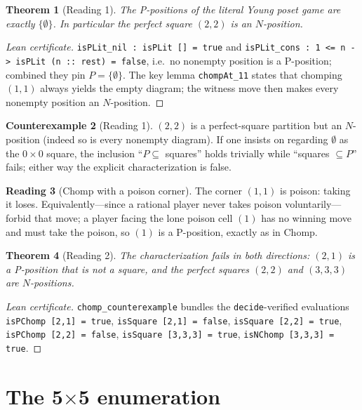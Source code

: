\documentclass[11pt]{article}
\newtheorem{theorem}{Theorem}
\theoremstyle{definition}
\newtheorem{reading}[theorem]{Reading}
\newtheorem{counterexample}[theorem]{Counterexample}
\begin{document}
\begin{theorem}[Reading 1]
The P-positions of the literal Young poset game are exactly $\{\emptyset\}$. In particular the
perfect square $(2,2)$ is an $N$-position.
\end{theorem}

\begin{proof}[Lean certificate]
\texttt{isPLit\_nil : isPLit [] = true} and \texttt{isPLit\_cons : 1 <= n -> isPLit (n :: rest)
= false}, i.e.\ no nonempty position is a P-position; combined they pin $P=\{\emptyset\}$.
The key lemma \texttt{chompAt\_11} states that chomping $(1,1)$ always yields the empty
diagram; the witness move then makes every nonempty position an $N$-position.
\end{proof}

\begin{counterexample}[Reading 1]
$(2,2)$ is a perfect-square partition but an $N$-position (indeed so is every nonempty
diagram). If one insists on regarding $\emptyset$ as the $0\times0$ square, the inclusion
``$P\subseteq$ squares'' holds trivially while ``squares $\subseteq P$'' fails; either way the
explicit characterization is false.
\end{counterexample}

\begin{reading}[Chomp with a poison corner]
The corner $(1,1)$ is poison: taking it loses. Equivalently---since a rational player never
takes poison voluntarily---forbid that move; a player facing the lone poison cell $(1)$ has no
winning move and must take the poison, so $(1)$ is a P-position, exactly as in Chomp.
\end{reading}

\begin{theorem}[Reading 2]
The characterization fails in both directions: $(2,1)$ is a P-position that is not a square,
and the perfect squares $(2,2)$ and $(3,3,3)$ are $N$-positions.
\end{theorem}

\begin{proof}[Lean certificate]
\texttt{chomp\_counterexample} bundles the \texttt{decide}-verified evaluations
\texttt{isPChomp [2,1] = true}, \texttt{isSquare [2,1] = false},
\texttt{isSquare [2,2] = true}, \texttt{isPChomp [2,2] = false},
\texttt{isSquare [3,3,3] = true}, \texttt{isNChomp [3,3,3] = true}.
\end{proof}

\section*{The 5\texorpdfstring{$\times$}{x}5 enumeration}
\end{document}
